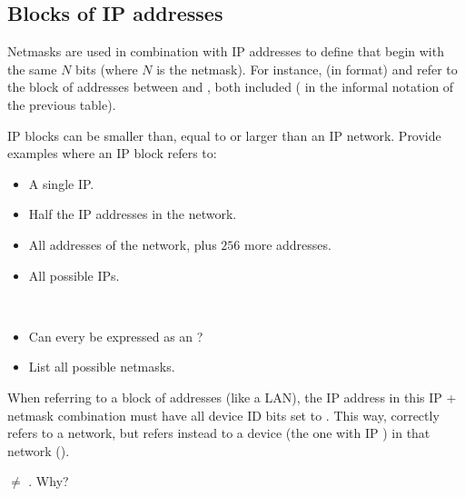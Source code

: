 \subsection*{Blocks of IP addresses}

Netmasks are used in combination with IP addresses to define 
that begin with the same $N$ bits (where $N$ is the netmask).
% 
For instance,  (in  format) 
and  refer to the block 
of addresses between  and ,
both included
( in the informal notation of the previous table).

\begin{exercise} 
IP blocks can be smaller than, equal to or larger than an IP network.
Provide examples where an IP block refers to:
\begin{itemize}
\item A single IP.
\item Half the IP addresses in the  network.
\item All addresses of the  network, plus 
      $256$ more addresses.
\item All possible IPs.
\end{itemize}
\end{exercise}


\begin{exercise}\ \\[-0.65cm]
\begin{itemize}
\item Can every  be expressed as an ?
\item List all possible netmasks.\\[-0.5cm]
\end{itemize}
\end{exercise}

When referring to a block of addresses (like a LAN), 
the IP address in this IP + netmask combination
must have all device ID bits set to . 
This way,  correctly refers to a network, but
 refers instead to a device 
(the one with IP ) in that network ().

\begin{exercise}
 $\ne$ . Why?
\end{exercise}

